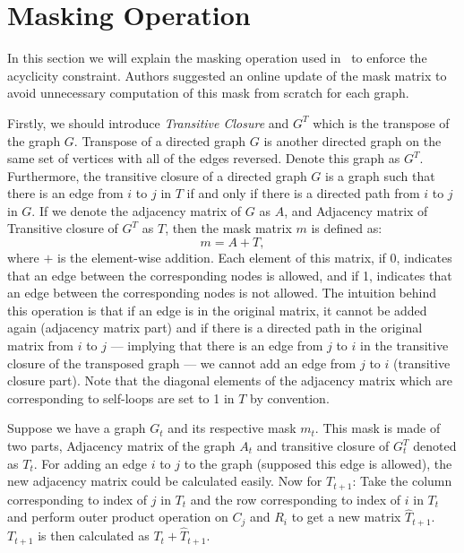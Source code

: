 \documentclass{lxaiproposal}
\begin{document}
    \section{Masking Operation}\label{app:masking}
    \vspace*{-3mm}

    In this section we will explain the masking operation used in~\cite{deleu2022daggflownet} to enforce the acyclicity
    constraint. Authors suggested an online update of the mask matrix to avoid unnecessary computation of this mask
    from scratch for each graph.

    Firstly, we should introduce \textit{Transitive Closure} and $G^T$ which is the transpose of the graph $G$.
    Transpose of a directed graph $G$ is another directed graph on the same set of vertices with all of the edges
    reversed. Denote this graph as $G^T$. Furthermore, the transitive closure of a directed graph $G$ is a graph
    such that there is an edge from $i$ to $j$ in $T$ if and only if there is a directed path from $i$ to $j$ in
    $G$. If we denote the adjacency matrix of $G$ as $A$, and Adjacency matrix of Transitive closure of $G^T$ as $T$,
    then the mask matrix $m$ is defined as:
    \[
        m = A + T,
    \]
    where $+$ is the element-wise addition.
    Each element of this matrix, if 0, indicates that an edge between the corresponding nodes is allowed, and if 1,
    indicates that an edge between the corresponding nodes is not allowed. The intuition behind this operation is
    that if an edge is in the original matrix, it cannot be added again (adjacency matrix part) and if there is a
    directed path in the original matrix from $i$ to $j$ --- implying that there is an edge from $j$ to $i$ in the
    transitive closure of the transposed graph --- we cannot add an edge from $j$ to $i$ (transitive closure part).
    Note that the diagonal elements of the adjacency matrix which are corresponding to self-loops are set to 1 in $T$
    by convention.

    Suppose we have a graph $G_t$ and its respective mask $m_t$. This mask is made of two parts, Adjacency matrix of
    the graph $A_t$ and transitive closure of $G_t^T$ denoted as $T_{t}$. For adding an edge $i$ to $j$ to the
    graph (supposed this edge is allowed), the new adjacency matrix could be calculated easily. Now for $T_{t+1}$:
    Take the column corresponding to index of $j$ in $T_t$ and the row corresponding to index of $i$ in $T_t$ and
    perform outer product operation on $C_j$ and $R_i$ to get a new matrix $\hat{T}_{t+1}$. $T_{t+1}$ is then
    calculated as $T_t + \hat{T}_{t+1}$.
\end{document}
